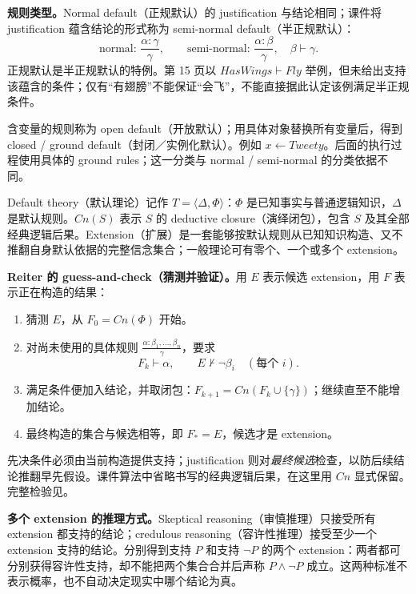 \textbf{规则类型。}Normal default（正规默认）的 justification 与结论相同；课件将 justification 蕴含结论的形式称为 semi-normal default（半正规默认）：
\[
 \text{normal: }\frac{\alpha:\gamma}{\gamma},\qquad
 \text{semi-normal: }\frac{\alpha:\beta}{\gamma},\quad\beta\vdash\gamma.
\]
正规默认是半正规默认的特例。第 15 页以 $HasWings\vdash Fly$ 举例，但未给出支持该蕴含的条件；仅有“有翅膀”不能保证“会飞”，不能直接据此认定该例满足半正规条件。

含变量的规则称为 open default（开放默认）；用具体对象替换所有变量后，得到 closed / ground default（封闭／实例化默认）。例如 $x\leftarrow Tweety$。后面的执行过程使用具体的 ground rules；这一分类与 normal / semi-normal 的分类依据不同。


Default theory（默认理论）记作 $T=\langle\Delta,\Phi\rangle$：$\Phi$ 是已知事实与普通逻辑知识，$\Delta$ 是默认规则。$Cn(S)$ 表示 $S$ 的 deductive closure（演绎闭包），包含 $S$ 及其全部经典逻辑后果。Extension（扩展）是一套能够按默认规则从已知知识构造、又不推翻自身默认依据的完整信念集合；一般理论可有零个、一个或多个 extension。

\textbf{Reiter 的 guess-and-check（猜测并验证）。}用 $E$ 表示候选 extension，用 $F$ 表示正在构造的结果：
\begin{enumerate}
 \item 猜测 $E$，从 $F_0=Cn(\Phi)$ 开始。
 \item 对尚未使用的具体规则 $\frac{\alpha:\beta_1,\ldots,\beta_n}{\gamma}$，要求
 \[
   F_k\vdash\alpha,\qquad E\nvdash\neg\beta_i\quad(\text{每个 }i).
 \]
 \item 满足条件便加入结论，并取闭包：$F_{k+1}=Cn(F_k\cup\{\gamma\})$；继续直至不能增加结论。
 \item 最终构造的集合与候选相等，即 $F_*=E$，候选才是 extension。
\end{enumerate}
先决条件必须由当前构造提供支持；justification 则对\emph{最终候选}检查，以防后续结论推翻早先假设。课件算法中省略书写的经典逻辑后果，在这里用 $Cn$ 显式保留。完整检验见。

\textbf{多个 extension 的推理方式。}Skeptical reasoning（审慎推理）只接受所有 extension 都支持的结论；credulous reasoning（容许性推理）接受至少一个 extension 支持的结论。分别得到支持 $P$ 和支持 $\neg P$ 的两个 extension：两者都可分别获得容许性支持，却不能把两个集合合并后声称 $P\land\neg P$ 成立。这两种标准不表示概率，也不自动决定现实中哪个结论为真。

